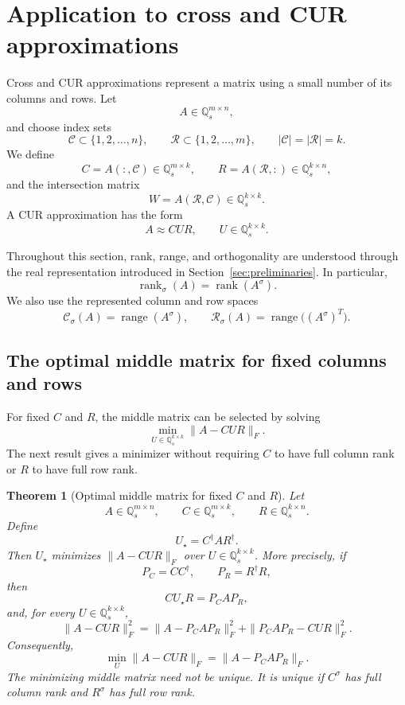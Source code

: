 \documentclass[12pt,a4paper]{article}
\theoremstyle{plain}
\newtheorem{theorem}{Theorem}[section]
\theoremstyle{definition}
\theoremstyle{remark}
\begin{document}
\section{Application to cross and CUR approximations}
\label{sec:cur}

Cross and CUR approximations represent a matrix using a small number of its
columns and rows.  Let
\[
    A\in\mathbb{Q}_s^{m\times n},
\]
and choose index sets
\[
    \mathcal{C}\subset\{1,2,\ldots,n\}, \qquad \mathcal{R}\subset\{1,2,\ldots,m\}, \qquad |\mathcal{C}|=|\mathcal{R}|=k.
\]
We define
\[
    C=A(:,\mathcal{C})\in\mathbb{Q}_s^{m\times k}, \qquad R=A(\mathcal{R},:)\in\mathbb{Q}_s^{k\times n},
\]
and the intersection matrix
\[
    W=A(\mathcal{R},\mathcal{C})\in\mathbb{Q}_s^{k\times k}.
\]
A CUR approximation has the form
\[
    A\approx CUR, \qquad U\in\mathbb{Q}_s^{k\times k}.
\]

Throughout this section, rank, range, and orthogonality are understood through the real representation introduced in Section~\ref{sec:preliminaries}.  In particular,
\[
    \operatorname{rank}_{\sigma}(A) = \operatorname{rank}(A^\sigma).
\]
We also use the represented column and row spaces
\[
    \mathcal{C}_{\sigma}(A) = \operatorname{range}(A^\sigma), \qquad \mathcal{R}_{\sigma}(A) =  \operatorname{range}\bigl((A^\sigma)^T\bigr).
\]

\subsection{The optimal middle matrix for fixed columns and rows}

For fixed \(C\) and \(R\), the middle matrix can be selected by solving
\[
    \min_{U\in\mathbb{Q}_s^{k\times k}} \|A-CUR\|_F.
\]
The next result gives a minimizer without requiring \(C\) to have full column rank or \(R\) to have full row rank.

\begin{theorem}[Optimal middle matrix for fixed \(C\) and \(R\)]
\label{thm:cur-optimal-middle}
Let
\[
    A\in\mathbb{Q}_s^{m\times n}, \qquad C\in\mathbb{Q}_s^{m\times k}, \qquad R\in\mathbb{Q}_s^{k\times n}.
\]
Define
\[
    U_\star=C^\dagger A R^\dagger.
\]
Then \(U_\star\) minimizes \(\|A-CUR\|_F\) over \(U\in\mathbb{Q}_s^{k\times k}\).  More precisely, if
\[
    P_C=CC^\dagger, \qquad P_R=R^\dagger R,
\]
then
\[
    CU_\star R=P_C A P_R,
\]
and, for every \(U\in\mathbb{Q}_s^{k\times k}\),
\begin{equation} \label{eq:cur-pythagorean}
    \|A-CUR\|_F^2 = \|A-P_C A P_R\|_F^2 + \|P_C A P_R-CUR\|_F^2.
\end{equation}
Consequently,
\[
    \min_U\|A-CUR\|_F = \|A-P_C A P_R\|_F.
\]
The minimizing middle matrix need not be unique.  It is unique if \(C^\sigma\) has full column rank and \(R^\sigma\) has full row rank.
\end{theorem}
\end{document}
